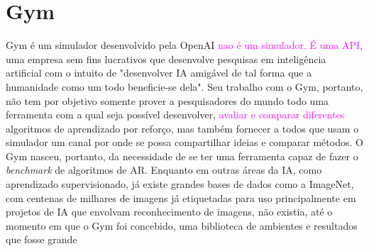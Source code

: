 \documentclass[cic,tc]{iiufrgs}
\newcommand\bruno[1]{\textcolor{magenta}{#1}}
\begin{document}
\section{Gym}
Gym é um simulador desenvolvido pela OpenAI \bruno{nao é um simulador. É uma API}, uma empresa sem fins lucrativos que desenvolve pesquisas em inteligência artificial com o intuito de
"desenvolver IA amigável de tal forma que a humanidade como um todo beneficie-se dela". Seu trabalho com o Gym, portanto, não tem por objetivo
somente prover a pesquisadores do mundo todo uma ferramenta com a qual seja possível desenvolver, \bruno{avaliar e comparar diferentes} algoritmos de aprendizado por reforço, mas também
fornecer a todos que usam o simulador um canal por onde se possa compartilhar ideias e comparar métodos. O Gym nasceu, portanto, da necessidade de
se ter uma ferramenta capaz de fazer o \textit{benchmark} de algoritmos de AR. Enquanto em outras áreas da IA, como aprendizado supervisionado,
já existe grandes bases de dados como a ImageNet, com centenas de milhares de imagens já etiquetadas para uso principalmente em projetos de IA que
envolvam reconhecimento de imagens, não existia, até o momento em que o Gym foi concebido, uma biblioteca de ambientes e resultados que fosse grande
\end{document}
